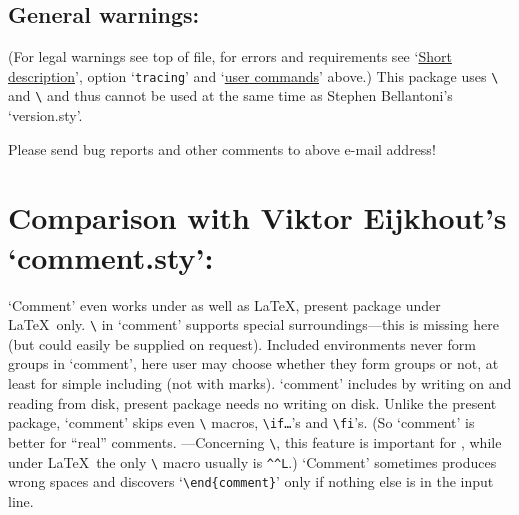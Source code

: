 \documentclass[pagesize=auto]{scrartcl}
\makeatletter
\newcommand*{\pkg}[1]{\textsf{#1}}
\newcommand*{\cs}[1]{\texttt{\textbackslash#1}}
\newcommand*{\cmd}[1]{\cs{\expandafter\@gobble\string#1}}
\newcommand*{\opt}[1]{\texttt{#1}}
\newcommand*{\meta}[1]{\textlangle\textsl{#1}\textrangle}
\newcommand*{\marg}[1]{\texttt{\{}\meta{#1}\texttt{\}}}
\makeatother
\begin{document}
\fussy
\renewcommand*{\labelenumi}{(\theenumi)}


\subsection{General warnings:}

(For legal warnings see top of file, for errors and requirements see `\hyperref[sec:short]{Short description}',
option `\opt{tracing}' and `\hyperref[sec:user]{user commands}' above.)
This package uses \cmd{} and \cmd{\excludeversion} and thus
cannot be used at the same time as Stephen Bellantoni's
`\pkg{version.sty}'.

\begin{framed}
  Please send bug reports and other comments to above e-mail address!
\end{framed}


\section{Comparison with Viktor Eijkhout's `\pkg{comment.sty}':}
\label{sec:comment}

`\pkg{Comment}' even works under  as well as \LaTeX, present package
under \LaTeX\ only. \cmd{\specialcomment} in `\pkg{comment}' supports special
surroundings---this is missing here (but could easily be supplied on
request).
Included environments never form groups in `\pkg{comment}', here user may
choose whether they form groups or not, at least for simple including
(not with marks). `\pkg{comment}' includes by writing on and reading from
disk, present package needs no writing on disk.
Unlike the present package, `\pkg{comment}' skips even \cmd{\outer} macros,
\cs{if\dots}'s and \cs{fi}'s. (So `\pkg{comment}' is better for ``real'' comments.
---Concerning \cmd{\outer}, this feature is important for , while
under \LaTeX\ the only \cmd{\outer} macro usually is \verb+^^L+.)
`\pkg{Comment}' sometimes produces wrong spaces
and discovers `\verb+\end{comment}+' only if nothing else is in the input
line.
\end{document}
